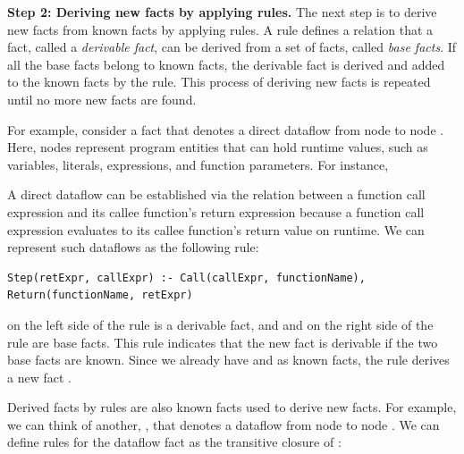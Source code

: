 \smallskip
\textbf{Step 2: Deriving new facts by applying rules.}
The next step is to derive new facts from known facts by applying rules.  A
rule defines a relation that a fact, called a {\it derivable fact}, can be
derived from a set of facts, called {\it base facts}.  If all the base facts
belong to known facts, the derivable fact is derived and added to the known
facts by the rule.  This process of deriving new facts is repeated until no
more new facts are found.


For example, consider a fact  that denotes a direct dataflow
from node  to node .  Here, nodes represent
program entities that can hold runtime values, such as variables, literals,
expressions, and function parameters.  For instance, 

A direct dataflow can be established via the relation between a function call
expression and its callee function's return expression because a function call
expression evaluates to its callee function's return value on runtime.  We can
represent such dataflows as the following rule:
\begin{lstlisting}[style=mrule]
Step(retExpr, callExpr) :- Call(callExpr, functionName), Return(functionName, retExpr)
\end{lstlisting}

\noindent
{} on the left side of the rule is a derivable
fact, and  and  on the right side of the rule are base facts.  This rule indicates
that the new fact  is derivable if the two base
facts are known.  Since we already have  and  as known facts, the rule derives a new fact .


Derived facts by rules are also known facts used to derive new facts.  For
example, we can think of another, , that denotes a dataflow
from node  to node .  We can define rules for the dataflow
fact as the transitive closure of :

